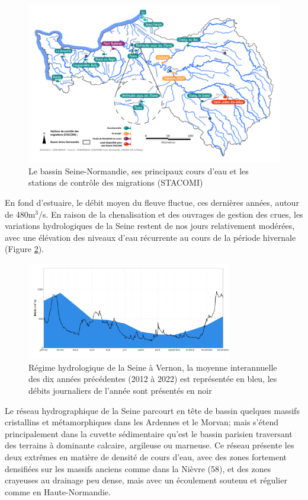 \documentclass[11pt,titlepage,twoside]{article}\usepackage[]{graphicx}\usepackage[table]{xcolor}
\begin{document}
\begin{figure}[htpb]
\centering
\includegraphics[width=\textwidth]{reseau_stacomi.png}
\caption{Le bassin Seine-Normandie, ses principaux cours d'eau et les stations de contrôle des migrations (STACOMI)}
\label{reseau_stacomi}
\end{figure}

En fond d'estuaire, le débit moyen du fleuve fluctue, ces dernières années, autour de 480m$^3$/s. En raison de la chenalisation et des ouvrages de gestion des crues, les variations hydrologiques de la Seine restent de nos jours relativement modérées, avec une élévation des niveaux d'eau récurrente au cours de la période hivernale
(Figure \ref{debit_seine_histo}).

\begin{figure}[htpb]
\centering
\includegraphics[width=0.8\textwidth]{debit_seine_histo.png}
\caption{Régime hydrologique de la Seine à Vernon, la moyenne interannuelle des dix années précédentes (2012 à 2022) est représentée en bleu, les débits journaliers de l'année sont présentés en noir}
\label{debit_seine_histo}
\end{figure}

Le réseau hydrographique de la Seine parcourt en tête de bassin quelques massifs cristallins et métamorphiques dans les Ardennes et le Morvan; mais s'étend principalement dans la cuvette sédimentaire qu'est le bassin parisien traversant des terrains à dominante calcaire, argileuse ou marneuse. Ce réseau présente les deux extrêmes en matière de densité de cours d'eau, avec des zones fortement densifiées sur les massifs anciens comme dans la Nièvre (58), et des zones crayeuses au drainage peu dense, mais avec un écoulement soutenu et régulier comme en Haute-Normandie.
\end{document}
